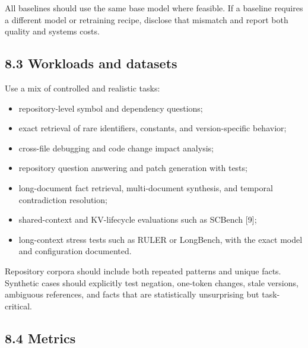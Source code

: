 \documentclass[
  10pt,
]{article}
\providecommand{\tightlist}{%
  \setlength{\itemsep}{0pt}\setlength{\parskip}{0pt}}
\begin{document}
All baselines should use the same base model where feasible. If a
baseline requires a different model or retraining recipe, disclose that
mismatch and report both quality and systems costs.

\subsection{8.3 Workloads and datasets}\label{workloads-and-datasets}

Use a mix of controlled and realistic tasks:

\begin{itemize}
\tightlist
\item
  repository-level symbol and dependency questions;
\item
  exact retrieval of rare identifiers, constants, and version-specific
  behavior;
\item
  cross-file debugging and code change impact analysis;
\item
  repository question answering and patch generation with tests;
\item
  long-document fact retrieval, multi-document synthesis, and temporal
  contradiction resolution;
\item
  shared-context and KV-lifecycle evaluations such as SCBench {[}9{]};
\item
  long-context stress tests such as RULER or LongBench, with the exact
  model and configuration documented.
\end{itemize}

Repository corpora should include both repeated patterns and unique
facts. Synthetic cases should explicitly test negation, one-token
changes, stale versions, ambiguous references, and facts that are
statistically unsurprising but task-critical.

\subsection{8.4 Metrics}\label{metrics}
\end{document}
